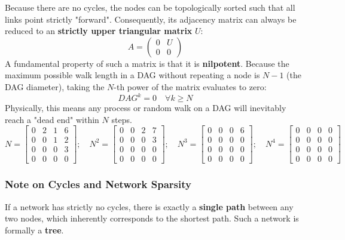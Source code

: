 Because there are no cycles, the nodes can be topologically sorted such that all links point strictly "forward". Consequently, its adjacency matrix can always be reduced to an \textbf{strictly upper triangular matrix} $U$:
\[
    A = \begin{pmatrix}
        0 & U \\
        0 & 0
    \end{pmatrix}
\]
A fundamental property of such a matrix is that it is \textbf{nilpotent}. Because the maximum possible walk length in a DAG without repeating a node is $N-1$ (the DAG diameter), taking the $N$-th power of the matrix evaluates to zero:
\[
    DAG^k = 0 \quad \forall k \geq N
\]
Physically, this means any process or random walk on a DAG will inevitably reach a "dead end" within $N$ steps.
\[
    N = \begin{bmatrix}
        0 & 2 & 1 & 6 \\
        0 & 0 & 1 & 2 \\
        0 & 0 & 0 & 3 \\
        0 & 0 & 0 & 0
    \end{bmatrix}; \quad
    N^2 = \begin{bmatrix}
        0 & 0 & 2 & 7 \\
        0 & 0 & 0 & 3 \\
        0 & 0 & 0 & 0 \\
        0 & 0 & 0 & 0
    \end{bmatrix}; \quad
    N^3 = \begin{bmatrix}
        0 & 0 & 0 & 6 \\
        0 & 0 & 0 & 0 \\
        0 & 0 & 0 & 0 \\
        0 & 0 & 0 & 0
    \end{bmatrix}; \quad
    N^4 = \begin{bmatrix}
        0 & 0 & 0 & 0 \\
        0 & 0 & 0 & 0 \\
        0 & 0 & 0 & 0 \\
        0 & 0 & 0 & 0
    \end{bmatrix}
\]

\subsubsection{Note on Cycles and Network Sparsity}
If a network has strictly no cycles, there is exactly a \textbf{single path} between any two nodes, which inherently corresponds to the shortest path. Such a network is formally a \textbf{tree}.

